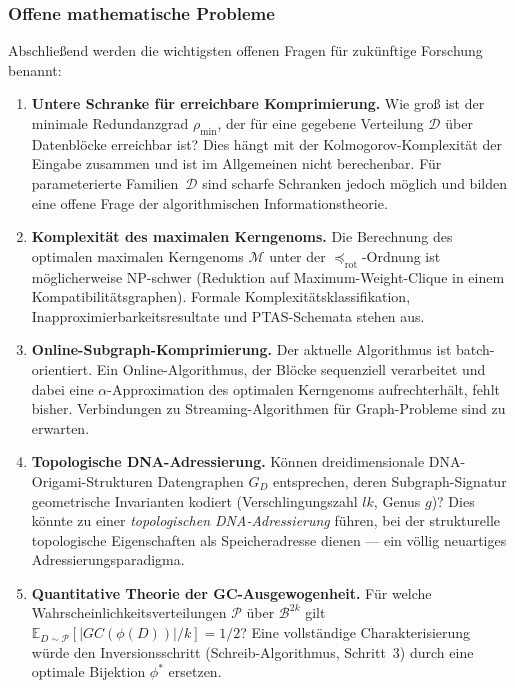 ﻿\documentclass[a4paper,12pt]{article}
\theoremstyle{definition}
\begin{document}
\subsubsection*{Offene mathematische Probleme}

Abschlie\ss{}end werden die wichtigsten offenen Fragen f\"{u}r zuk\"{u}nftige
Forschung benannt:
\begin{enumerate}
    \item \textbf{Untere Schranke f\"{u}r erreichbare Komprimierung.}
          Wie gro\ss{} ist der minimale Redundanzgrad $\rho_{\min}$,
          der f\"{u}r eine gegebene Verteilung $\mathcal{D}$ \"{u}ber
          Datenbl\"{o}cke erreichbar ist?
          Dies h\"{a}ngt mit der Kolmogorov-Komplexit\"{a}t der Eingabe
          zusammen und ist im Allgemeinen nicht berechenbar.
          F\"{u}r parameterierte Familien~$\mathcal{D}$ sind scharfe
          Schranken jedoch m\"{o}glich und bilden eine offene Frage
          der algorithmischen Informationstheorie.
    \item \textbf{Komplexit\"{a}t des maximalen Kerngenoms.}
          Die Berechnung des optimalen maximalen Kerngenoms $\mathcal{M}$
          unter der $\preceq_{\mathrm{rot}}$-Ordnung ist m\"{o}glicherweise
          NP-schwer (Reduktion auf Maximum-Weight-Clique in einem
          Kompatibilit\"{a}tsgraphen).
          Formale Komplexit\"{a}tsklassifikation, Inapproximierbarkeitsresultate
          und PTAS-Schemata stehen aus.
    \item \textbf{Online-Subgraph-Komprimierung.}
          Der aktuelle Algorithmus ist batch-orientiert.
          Ein Online-Algorithmus, der Bl\"{o}cke sequenziell verarbeitet
          und dabei eine $\alpha$-Approxi\-mation des optimalen Kerngenoms
          aufrechterh\"{a}lt, fehlt bisher.
          Verbindungen zu Streaming-Algorithmen f\"{u}r Graph-Probleme
          sind zu erwarten.
    \item \textbf{Topologische DNA-Adressierung.}
          K\"{o}nnen dreidimensionale DNA-Origami-Struk\-turen Datengraphen
          $G_D$ entsprechen, deren Subgraph-Signatur geometrische
          Invarianten kodiert (Verschlingungszahl $lk$, Genus $g$)?
          Dies k\"{o}nnte zu einer \emph{topologischen DNA-Adressierung}
          f\"{u}hren, bei der strukturelle topologische Eigenschaften
          als Speicheradresse dienen --- ein v\"{o}llig neuartiges
          Adressierungsparadigma.
    \item \textbf{Quantitative Theorie der GC-Ausgewogenheit.}
          F\"{u}r welche Wahrscheinlichkeitsverteilungen $\mathcal{P}$
          \"{u}ber $\mathcal{B}^{2k}$ gilt
          $\mathbb{E}_{D \sim \mathcal{P}}[|GC(\phi(D))|/k] = 1/2$?
          Eine vollst\"{a}ndige Charakterisierung w\"{u}rde den
          Inversionsschritt (Schreib-Algorithmus, Schritt~3) durch eine
          optimale Bijektion $\phi^*$ ersetzen.
\end{enumerate}
\end{document}
